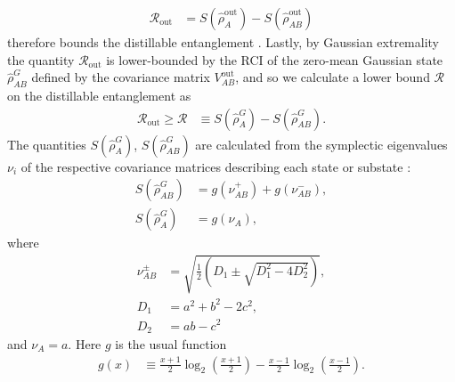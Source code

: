 \documentclass[%
 reprint,
 superscriptaddress,
 amsmath,
 amssymb,
 aps,
 pra,
]{revtex4-2}
\newcommand{\LL}{\left}
\newcommand{\RR}{\right}
\begin{document}
\begin{widetext}
\begin{align}
    \mathcal{R}_\mathrm{out} &= S(\hat \rho_{A}^\mathrm{out}) - S(\hat \rho_{AB}^\mathrm{out})
\end{align}
therefore bounds the distillable entanglement \cite{weedbrook_gaussian_2012, winnel_generalized_2020, pirandola_advances_2020}. Lastly, by Gaussian extremality the quantity $\mathcal{R}_\mathrm{out}$ is lower-bounded by the RCI of the zero-mean Gaussian state $\hat \rho_{AB}^G$ defined by the covariance matrix $V_{AB}^\mathrm{out}$, and so we calculate a lower bound $\mathcal{R}$ on the distillable entanglement as
\begin{align}
    \mathcal{R}_\mathrm{out} \geq \mathcal{R} &\equiv S(\hat \rho_{A}^G) - S(\hat \rho_{AB}^G).
\end{align}
The quantities $S(\hat \rho_{A}^G)$, $S(\hat \rho_{AB}^G)$ are calculated from the symplectic eigenvalues $\nu_i$ of the respective covariance matrices describing each state or substate \cite{weedbrook_gaussian_2012}:
\begin{align}
    S(\hat \rho^G_{AB}) &= g(\nu_{AB}^+) + g(\nu_{AB}^-), \\
    S(\hat \rho^G_{A}) &= g(\nu_A),
\end{align}
where
\begin{align}
    \nu_{AB}^\pm &= \sqrt{\frac{1}{2} \LL( D_1 \pm \sqrt{D_1^2 - 4 D_2^2} \RR)}, \\
    D_1 &= a^2 + b^2 - 2c^2, \\
    D_2 &= a b - c^2
\end{align}
and $\nu_A = a$. Here $g$ is the usual function \cite{weedbrook_gaussian_2012}
\begin{align}
    g(x) &\equiv \frac{x+1}{2} \log_2 \left( \frac{x+1}{2} \right) - \frac{x-1}{2} \log_2 \left( \frac{x-1}{2} \right).
\end{align}


\end{widetext}
\end{document}
